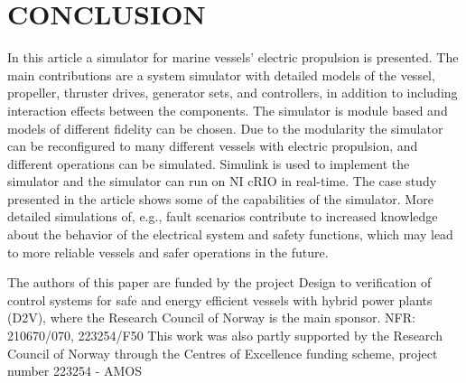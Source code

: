 \documentclass[twocolumn,10pt]{asme2e}
\begin{document}
\section*{\uppercase{Conclusion}}
\label{sec:conclusion}
In this article a simulator for marine vessels' electric propulsion is presented.
The main contributions are a system simulator with detailed models of the vessel, propeller, thruster drives, generator sets, and controllers, in addition to including interaction effects between the components.
The simulator is module based and models of different fidelity can be chosen.
Due to the modularity the simulator can be reconfigured to many different vessels with electric propulsion, and different operations can be simulated.
Simulink is used to implement the simulator and the simulator can run on NI cRIO in real-time.
The case study presented in the article shows some of the capabilities of the simulator. More detailed simulations of, e.g.,  fault scenarios contribute to increased knowledge about the behavior of the electrical system and safety functions, which may lead to more reliable vessels and safer operations in the future. 



\begin{acknowledgment}
The authors of this paper are funded by the project Design to verification of control systems for safe and energy efficient vessels with hybrid power plants (D2V), where the Research Council of Norway is the main sponsor. NFR: 210670/070, 223254/F50
This work was also partly supported by the Research Council of Norway through the Centres of Excellence funding scheme, project number 223254 - AMOS
\end{acknowledgment}




%




\appendix       %
\end{document}
